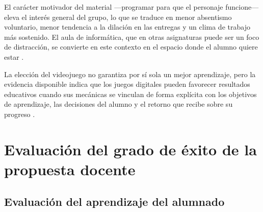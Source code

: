 \documentclass[a4paper,12pt]{article}
\begin{document}
El carácter motivador del material ---programar para que el personaje funcione--- eleva el interés general del grupo, lo que se traduce en menor absentismo voluntario, menor tendencia a la dilación en las entregas y un clima de trabajo más sostenido. El aula de informática, que en otras asignaturas puede ser un foco de distracción, se convierte en este contexto en el espacio donde el alumno quiere estar \citep{clark2016digital}.


La elección del videojuego no garantiza por sí sola un mejor aprendizaje, pero la evidencia disponible indica que los juegos digitales pueden favorecer resultados educativos cuando sus mecánicas se vinculan de forma explícita con los objetivos de aprendizaje, las decisiones del alumno y el retorno que recibe sobre su progreso \citep{clark2016digital}.
\section{Evaluación del grado de éxito de la propuesta docente}

\subsection{Evaluación del aprendizaje del alumnado}
\end{document}
